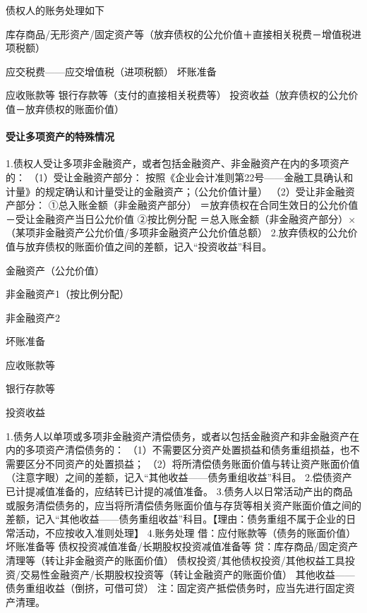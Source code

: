 \documentclass[UTF8,12pt]{ctexart}
\newenvironment{Dr}{%
	\begin{list}{}%
		{
			\setlength{\leftmargin}{2em}
			\setlength{\labelwidth}{2em}
			\setlength{\labelsep}{0pt}
			\setlength{\itemindent}{0pt}
			\setlength{\listparindent}{0pt}
			\setlength{\parsep}{0pt}
			\setlength{\topsep}{0pt}
		}
		\item[\textbf{借：}]
	}{%
	\end{list}
}
\newenvironment{Cr}{%
	\begin{list}{}%
		{
			\setlength{\leftmargin}{2em}
			\setlength{\labelwidth}{2em}
			\setlength{\labelsep}{0pt}
			\setlength{\itemindent}{0pt}
			\setlength{\listparindent}{0pt}
			\setlength{\parsep}{0pt}
			\setlength{\topsep}{0pt}
		}
		\item[\textbf{贷：}]
	}{%
	\end{list}
}
\numberwithin{equation}{section} %
\numberwithin{figure}{section}
\numberwithin{table}{section}
\begin{document}
	债权人的账务处理如下
	\begin{Dr}
		库存商品/无形资产/固定资产等（放弃债权的公允价值＋直接相关税费－增值税进项税额）
		
		应交税费——应交增值税（进项税额）
		坏账准备
		
	\end{Dr}
	\begin{Cr}
		应收账款等
		银行存款等（支付的直接相关税费等）
		投资收益（放弃债权的公允价值－放弃债权的账面价值）
		
	\end{Cr}
	
	\paragraph{受让多项资产的特殊情况}
	1.债权人受让多项非金融资产，或者包括金融资产、非金融资产在内的多项资产的：
	（1）受让金融资产部分：
	按照《企业会计准则第22号——金融工具确认和计量》的规定确认和计量受让的金融资产；（公允价值计量）
	（2）受让非金融资产部分：
	①总入账金额（非金融资产部分）
	＝放弃债权在合同生效日的公允价值－受让金融资产当日公允价值
	②按比例分配
	＝总入账金额（非金融资产部分）×（某项非金融资产公允价值/多项非金融资产公允价值总额）
	2.放弃债权的公允价值与放弃债权的账面价值之间的差额，记入“投资收益”科目。
	
	\begin{Dr}
		金融资产（公允价值）
		
		非金融资产1（按比例分配）
		
		非金融资产2
		
		坏账准备
	\end{Dr}
	\begin{Cr}
		应收账款等
		
		银行存款等
		
		投资收益
	\end{Cr}
	
	1.债务人以单项或多项非金融资产清偿债务，或者以包括金融资产和非金融资产在内的多项资产清偿债务的：
	（1）不需要区分资产处置损益和债务重组损益，也不需要区分不同资产的处置损益；
	（2）将所清偿债务账面价值与转让资产账面价值（注意字眼）之间的差额，记入“其他收益——债务重组收益”科目。
	2.偿债资产已计提减值准备的，应结转已计提的减值准备。
	3.债务人以日常活动产出的商品或服务清偿债务的，应当将所清偿债务账面价值与存货等相关资产账面价值之间的差额，记入“其他收益——债务重组收益”科目。【理由：债务重组不属于企业的日常活动，不应按收入准则处理】
	4.账务处理
	借：应付账款等（债务的账面价值）
	坏账准备等
	债权投资减值准备/长期股权投资减值准备等
	贷：库存商品/固定资产清理等（转让非金融资产的账面价值）
	债权投资/其他债权投资/其他权益工具投资/交易性金融资产/长期股权投资等（转让金融资产的账面价值）
	其他收益——债务重组收益（倒挤，可借可贷）
	注：固定资产抵偿债务时，应当先进行固定资产清理。
	
\end{document}
